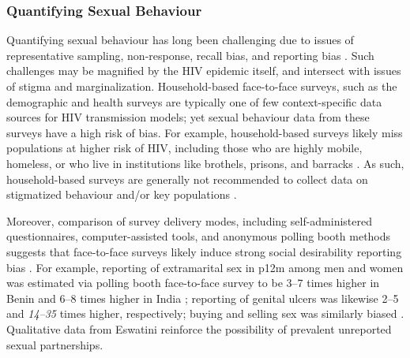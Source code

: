 \subsubsection{Quantifying Sexual Behaviour}\label{model.disc.par.sex}
Quantifying sexual behaviour has long been challenging due to
issues of representative sampling, non-response, recall bias, and reporting bias \cite{Fenton2001}.
Such challenges may be magnified by the HIV epidemic itself,
and intersect with issues of stigma and marginalization.
Household-based face-to-face surveys, such as the demographic and health surveys \cite{DHS}
are typically one of few context-specific data sources for HIV transmission models;
yet sexual behaviour data from these surveys have a high risk of bias.
For example, household-based surveys likely miss populations at higher risk of HIV,
including those who are highly mobile, homeless, or who live in institutions
like brothels, prisons, and barracks \cite{GarciaCalleja2005,Mishra2008,Cassels2014,Camlin2016}.
As such, household-based surveys are generally not recommended to collect data on
stigmatized behaviour and/or key populations \cite{UNAIDS2010kps,Abdul-Quader2014}.
\par
Moreover, comparison of survey delivery modes, including
self-administered questionnaires, computer-assisted tools, and anonymous polling booth methods
suggests that face-to-face surveys likely induce strong social desirability reporting bias
\cite{Langhaug2010,Lowndes2012}.
For example, reporting of extramarital sex in p12m among men and women
was estimated via polling booth \vs face-to-face survey to be
3--7 times higher in Benin \cite{Behanzin2013} and 6--8 times higher in India \cite{Lowndes2012};
reporting of genital ulcers was likewise 2--5 and \emph{14--35} times higher, respectively;
buying and selling sex was similarly biased \cite{Behanzin2013,Lowndes2012}.
Qualitative data from Eswatini \cite{Ruark2014,Fielding-Miller2016,Ruark2019,Pulerwitz2021}
reinforce the possibility of prevalent unreported sexual partnerships.
